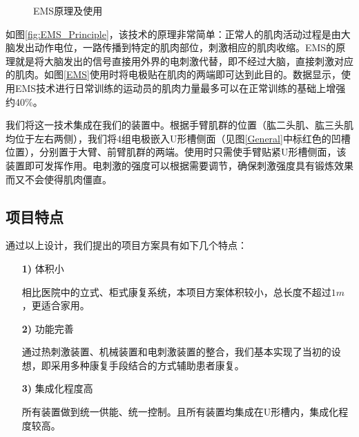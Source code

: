 \documentclass[UTF8]{ctexart}
\begin{document}
            \begin{figure}[H]
                \centering  %
                \label{Fig.main}
                \caption{EMS原理及使用}
            \end{figure}
           
            如图\ref{fig:EMS_Principle}，该技术的原理非常简单：正常人的肌肉活动过程是由大脑发出动作电位，一路传播到特定的肌肉部位，刺激相应的肌肉收缩。EMS的原理就是将大脑发出的信号直接用外界的电刺激代替，即不经过大脑，直接刺激对应的肌肉。如图\ref{EMS}使用时将电极贴在肌肉的两端即可达到此目的。数据显示，使用EMS技术进行日常训练的运动员的肌肉力量最多可以在正常训练的基础上增强约40\%。

            我们将这一技术集成在我们的装置中。根据手臂肌群的位置（肱二头肌、肱三头肌均位于左右两侧），我们将4组电极嵌入U形槽侧面（见图\ref{General}中标红色的凹槽位置），分别置于大臂、前臂肌群的两端。使用时只需使手臂贴紧U形槽侧面，该装置即可发挥作用。电刺激的强度可以根据需要调节，确保刺激强度具有锻炼效果而又不会使得肌肉僵直。
    \subsection{项目特点}
        通过以上设计，我们提出的项目方案具有如下几个特点：
        \begin{enumerate}
            \item[\textbf{1)}]体积小
             
                相比医院中的立式、柜式康复系统，本项目方案体积较小，总长度不超过$1m$，更适合家用。
            \item[\textbf{2)}] 功能完善
            
                通过热刺激装置、机械装置和电刺激装置的整合，我们基本实现了当初的设想，即采用多种康复手段结合的方式辅助患者康复。 
            \item[\textbf{3)}]集成化程度高
                
                所有装置做到统一供能、统一控制。且所有装置均集成在U形槽内，集成化程度较高。
        \end{enumerate}
\newpage
\end{document}
